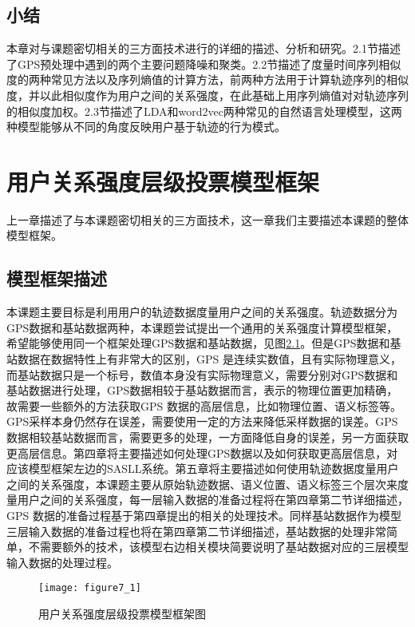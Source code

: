 \section{小结}
\label{sec:section2-4}
本章对与课题密切相关的三方面技术进行的详细的描述、分析和研究。2.1节描述了GPS预处理中遇到的两个主要问题降噪和聚类。2.2节描述了度量时间序列相似度的两种常见方法以及序列熵值的计算方法，前两种方法用于计算轨迹序列的相似度，并以此相似度作为用户之间的关系强度，在此基础上用序列熵值对对轨迹序列的相似度加权。2.3节描述了LDA和word2vec两种常见的自然语言处理模型，这两种模型能够从不同的角度反映用户基于轨迹的行为模式。
\chapter{用户关系强度层级投票模型框架}
\label{chap:chapter07}
上一章描述了与本课题密切相关的三方面技术，这一章我们主要描述本课题的整体模型框架。
\section{模型框架描述}
\label{sec:section7-1}
本课题主要目标是利用用户的轨迹数据度量用户之间的关系强度。轨迹数据分为GPS数据和基站数据两种，本课题尝试提出一个通用的关系强度计算模型框架，希望能够使用同一个框架处理GPS数据和基站数据，见图\ref{fig:7_1}。但是GPS数据和基站数据在数据特性上有非常大的区别，GPS 是连续实数值，且有实际物理意义，而基站数据只是一个标号，数值本身没有实际物理意义，需要分别对GPS数据和基站数据进行处理，GPS数据相较于基站数据而言，表示的物理位置更加精确，故需要一些额外的方法获取GPS 数据的高层信息，比如物理位置、语义标签等。GPS采样本身仍然存在误差，需要使用一定的方法来降低采样数据的误差。GPS数据相较基站数据而言，需要更多的处理，一方面降低自身的误差，另一方面获取更高层信息。第四章将主要描述如何处理GPS数据以及如何获取更高层信息，对应该模型框架左边的SASLL系统。第五章将主要描述如何使用轨迹数据度量用户之间的关系强度，本课题主要从原始轨迹数据、语义位置、语义标签三个层次来度量用户之间的关系强度，每一层输入数据的准备过程将在第四章第二节详细描述，GPS 数据的准备过程基于第四章提出的相关的处理技术。同样基站数据作为模型三层输入数据的准备过程也将在第四章第二节详细描述，基站数据的处理非常简单，不需要额外的技术，该模型右边相关模块简要说明了基站数据对应的三层模型输入数据的处理过程。
\begin{figure}[htp]
\centering
\texttt{[image: figure7\_1]}
\caption{用户关系强度层级投票模型框架图}
\label{fig:7_1}
\end{figure}
